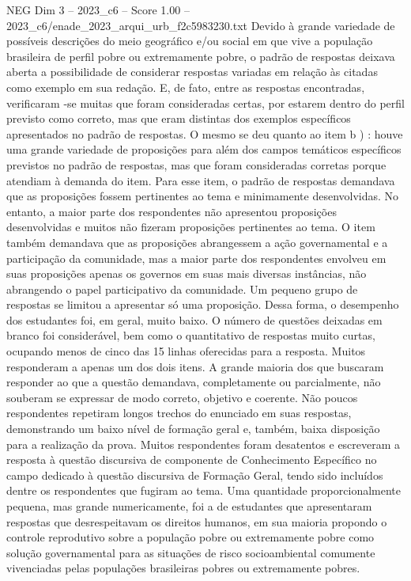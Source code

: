 \begin{textsample}{NEG Dim 3 – 2023\_c6 – Score 1.00 – 2023\_c6/enade\_2023\_arqui\_urb\_f2c5983230.txt}
Devido à grande variedade de possíveis descrições do meio geográfico e/ou social em que vive a população brasileira de perfil pobre ou extremamente pobre, o padrão de respostas deixava aberta a possibilidade de considerar respostas variadas em relação às citadas como exemplo em sua redação.
E, de fato, entre as respostas encontradas, verificaram -se muitas que foram consideradas certas, por estarem dentro do perfil previsto como correto, mas que eram distintas dos exemplos específicos apresentados no padrão de respostas.
O mesmo se deu quanto ao item b ) : houve uma grande variedade de proposições para além dos campos temáticos específicos previstos no padrão de respostas, mas que foram consideradas corretas porque atendiam à demanda do item.
Para esse item, o padrão de respostas demandava que as proposições fossem pertinentes ao tema e minimamente desenvolvidas.
No entanto, a maior parte dos respondentes não apresentou proposições desenvolvidas e muitos não fizeram proposições pertinentes ao tema.
O item também demandava que as proposições abrangessem a ação governamental e a participação da comunidade, mas a maior parte dos respondentes envolveu em suas proposições apenas os governos em suas mais diversas instâncias, não abrangendo o papel participativo da comunidade.
Um pequeno grupo de respostas se limitou a apresentar só uma proposição.
Dessa forma, o desempenho dos estudantes foi, em geral, muito baixo.
O número de questões deixadas em branco foi considerável, bem como o quantitativo de respostas muito curtas, ocupando menos de cinco das 15 linhas oferecidas para a resposta.
Muitos responderam a apenas um dos dois itens.
A grande maioria dos que buscaram responder ao que a questão demandava, completamente ou parcialmente, não souberam se expressar de modo correto, objetivo e coerente.
Não poucos respondentes repetiram longos trechos do enunciado em suas respostas, demonstrando um baixo nível de formação geral e, também, baixa disposição para a realização da prova.
Muitos respondentes foram desatentos e escreveram a resposta à questão discursiva de componente de Conhecimento Específico no campo dedicado à questão discursiva de Formação Geral, tendo sido incluídos dentre os respondentes que fugiram ao tema.
Uma quantidade proporcionalmente pequena, mas grande numericamente, foi a de estudantes que apresentaram respostas que desrespeitavam os direitos humanos, em sua maioria propondo o controle reprodutivo sobre a população pobre ou extremamente pobre como solução governamental para as situações de risco socioambiental comumente vivenciadas pelas populações brasileiras pobres ou extremamente pobres.

\end{textsample}
